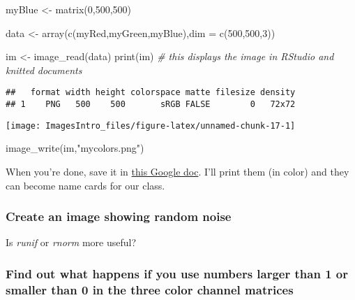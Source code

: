 \documentclass[
]{article}
\newenvironment{Shaded}{\begin{snugshade}}{\end{snugshade}}
\newcommand{\AttributeTok}[1]{\textcolor[rgb]{0.77,0.63,0.00}{#1}}
\newcommand{\CommentTok}[1]{\textcolor[rgb]{0.56,0.35,0.01}{\textit{#1}}}
\newcommand{\DecValTok}[1]{\textcolor[rgb]{0.00,0.00,0.81}{#1}}
\newcommand{\FunctionTok}[1]{\textcolor[rgb]{0.00,0.00,0.00}{#1}}
\newcommand{\NormalTok}[1]{#1}
\newcommand{\OtherTok}[1]{\textcolor[rgb]{0.56,0.35,0.01}{#1}}
\newcommand{\StringTok}[1]{\textcolor[rgb]{0.31,0.60,0.02}{#1}}
\begin{document}
\begin{Shaded}
\begin{Highlighting}[]
\NormalTok{myBlue }\OtherTok{\textless{}{-}} \FunctionTok{matrix}\NormalTok{(}\DecValTok{0}\NormalTok{,}\DecValTok{500}\NormalTok{,}\DecValTok{500}\NormalTok{)}


\NormalTok{data }\OtherTok{\textless{}{-}} \FunctionTok{array}\NormalTok{(}\FunctionTok{c}\NormalTok{(myRed,myGreen,myBlue),}\AttributeTok{dim =} \FunctionTok{c}\NormalTok{(}\DecValTok{500}\NormalTok{,}\DecValTok{500}\NormalTok{,}\DecValTok{3}\NormalTok{))}

\NormalTok{im }\OtherTok{\textless{}{-}} \FunctionTok{image\_read}\NormalTok{(data) }
\FunctionTok{print}\NormalTok{(im) }\CommentTok{\# this displays the image in RStudio and knitted documents}
\end{Highlighting}
\end{Shaded}

\begin{verbatim}
##   format width height colorspace matte filesize density
## 1    PNG   500    500       sRGB FALSE        0   72x72
\end{verbatim}

\texttt{[image: ImagesIntro\_files/figure-latex/unnamed-chunk-17-1]}

\begin{Shaded}
\begin{Highlighting}[]
\FunctionTok{image\_write}\NormalTok{(im,}\StringTok{"mycolors.png"}\NormalTok{)}
\end{Highlighting}
\end{Shaded}

When you're done, save it in
\href{https://docs.google.com/document/d/1s1axnlolpOGDqnVTa38m4AzHkJXJrK690bzXXAyIJVI/edit?usp=sharing}{this
Google doc}. I'll print them (in color) and they can become name cards
for our class.

\hypertarget{create-an-image-showing-random-noise}{%
\subsubsection{Create an image showing random
noise}\label{create-an-image-showing-random-noise}}

Is \emph{runif} or \emph{rnorm} more useful?

\hypertarget{find-out-what-happens-if-you-use-numbers-larger-than-1-or-smaller-than-0-in-the-three-color-channel-matrices}{%
\subsubsection{Find out what happens if you use numbers larger than 1 or
smaller than 0 in the three color channel
matrices}\label{find-out-what-happens-if-you-use-numbers-larger-than-1-or-smaller-than-0-in-the-three-color-channel-matrices}}
\end{document}
